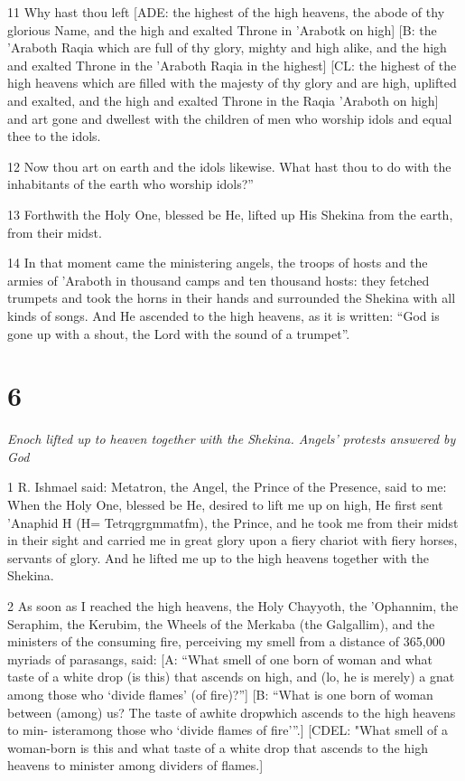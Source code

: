 \par 11 Why hast thou left [ADE: the highest of the high heavens, the abode of thy glorious Name, and the high and exalted Throne in 'Arabotk on high] [B: the 'Araboth Raqia which are full of thy glory, mighty and high alike, and the high and exalted Throne in the 'Araboth Raqia in the highest] [CL: the highest of the high heavens which are filled with the majesty of thy glory and are high, uplifted and exalted, and the high and exalted Throne in the Raqia 'Araboth on high] and art gone and dwellest with the children of men who worship idols and equal thee to the idols. 

\par 12 Now thou art on earth and the idols likewise. What hast thou to do with the inhabitants of the earth who worship idols?”

\par 13 Forthwith the Holy One, blessed be He, lifted up His Shekina from the earth, from their midst. 

\par 14 In that moment came the ministering angels, the troops of hosts and the armies of 'Araboth in thousand camps and ten thousand hosts: they fetched trumpets and took the horns in their hands and surrounded the Shekina with all kinds of songs. And He ascended to the high heavens, as it is written: “God is gone up with a shout, the Lord with the sound of a trumpet”. 

\chapter{6}

\par \textit{Enoch lifted up to heaven together with the Shekina. Angels' protests answered by God}

\par 1 R. Ishmael said: Metatron, the Angel, the Prince of the Presence, said to me: When the Holy One, blessed be He, desired to lift me up on high, He first sent 'Anaphid H (H= Tetrqgrgmmatfm), the Prince, and he took me from their midst in their sight and carried me in great glory upon a fiery chariot with fiery horses, servants of glory. And he lifted me up to the high heavens together with the Shekina. 

\par 2 As soon as I reached the high heavens, the Holy Chayyoth, the 'Ophannim, the Seraphim, the Kerubim, the Wheels of the Merkaba (the Galgallim), and the ministers of the consuming fire, perceiving my smell from a distance of 365,000 myriads of parasangs, said: [A: “What smell of one born of woman and what taste of a white drop (is this) that ascends on high, and (lo, he is merely) a gnat among those who ‘divide flames’ (of fire)?”] [B: “What is one born of woman between (among) us? The taste of awhite dropwhich ascends to the high heavens to min- isteramong those who ‘divide flames of fire’”.] [CDEL: "What smell of a woman-born is this and what taste of a white drop that ascends to the high heavens to minister among dividers of flames.] 

